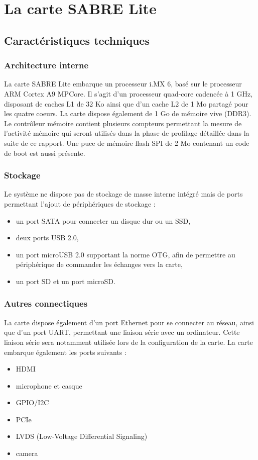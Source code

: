 \section{La carte SABRE Lite}

\subsection{Caractéristiques techniques}

\subsubsection{Architecture interne}
La carte SABRE Lite\cite{_i.mx_2014} embarque un processeur i.MX 6, basé sur le processeur ARM
Cortex A9 MPCore. Il s'agit d'un processeur quad-core cadencée à 1 GHz, 
disposant de caches L1 de 32 Ko ainsi que d'un cache L2 de 1 Mo partagé pour les
quatre coeurs. La carte dispose également de 1 Go de mémoire vive (DDR3). Le
contrôleur mémoire contient plusieurs compteurs permettant la mesure de 
l'activité mémoire qui seront utilisés dans la phase de profilage détaillée dans
la suite de ce rapport. Une puce de mémoire flash SPI de 2 Mo contenant un code
de boot est aussi présente.

\subsubsection{Stockage}
Le système ne dispose pas de stockage de masse interne intégré mais de ports
permettant l'ajout de périphériques de stockage :
\begin{itemize}
  \item un port SATA pour connecter un disque dur ou un SSD,
  \item deux ports USB 2.0,
  \item un port microUSB 2.0 supportant la norme OTG, afin de permettre au 
    périphérique de commander les échanges vers la carte,
  \item un port SD et un port microSD.
\end{itemize}

\subsubsection{Autres connectiques}
La carte dispose également d'un port Ethernet pour se connecter au réseau, ainsi
que d'un port UART, permettant une liaison série avec un ordinateur. Cette
liaison série sera notamment utilisée lors de la configuration de la carte. La
carte embarque également les ports suivants :
\begin{itemize}
  \item HDMI
  \item microphone et casque
  \item GPIO/I2C
  \item PCIe
  \item LVDS (Low-Voltage Differential Signaling)
  \item camera
\end{itemize}

